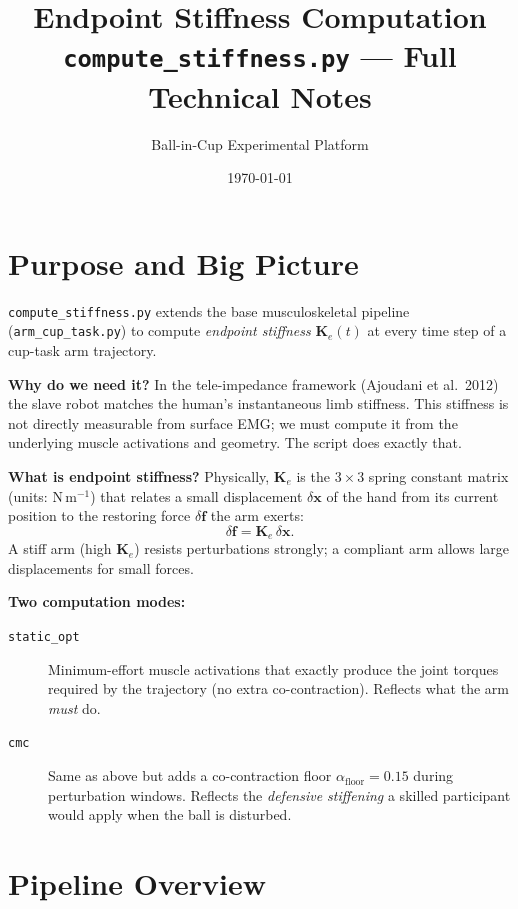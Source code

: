 \documentclass[11pt,a4paper]{article}
\title{\textbf{Endpoint Stiffness Computation}\\
       \large \texttt{compute\_stiffness.py} --- Full Technical Notes}
\author{Ball-in-Cup Experimental Platform}
\date{\today}
\begin{document}
\maketitle
\tableofcontents
\newpage

\section{Purpose and Big Picture}

\texttt{compute\_stiffness.py} extends the base musculoskeletal pipeline
(\texttt{arm\_cup\_task.py}) to compute \emph{endpoint stiffness}
$\mathbf{K}_e(t)$ at every time step of a cup-task arm trajectory.

\textbf{Why do we need it?}
In the tele-impedance framework (Ajoudani et al.\ 2012) the slave robot
matches the human's instantaneous limb stiffness. This stiffness is not
directly measurable from surface EMG; we must compute it from the underlying
muscle activations and geometry. The script does exactly that.

\textbf{What is endpoint stiffness?}
Physically, $\mathbf{K}_e$ is the $3\times3$ spring constant matrix
(units: N\,m$^{-1}$) that relates a small displacement $\delta\bm{x}$ of
the hand from its current position to the restoring force $\delta\bm{f}$
the arm exerts:
\[
  \delta\bm{f} = \mathbf{K}_e\,\delta\bm{x}.
\]
A stiff arm (high $\mathbf{K}_e$) resists perturbations strongly; a
compliant arm allows large displacements for small forces.

\textbf{Two computation modes:}
\begin{description}
  \item[\texttt{static\_opt}] Minimum-effort muscle activations that exactly
        produce the joint torques required by the trajectory (no extra
        co-contraction). Reflects what the arm \emph{must} do.
  \item[\texttt{cmc}] Same as above but adds a co-contraction floor
        $\alpha_\text{floor}=0.15$ during perturbation windows. Reflects the
        \emph{defensive stiffening} a skilled participant would apply when the
        ball is disturbed.
\end{description}

\section{Pipeline Overview}
\end{document}
